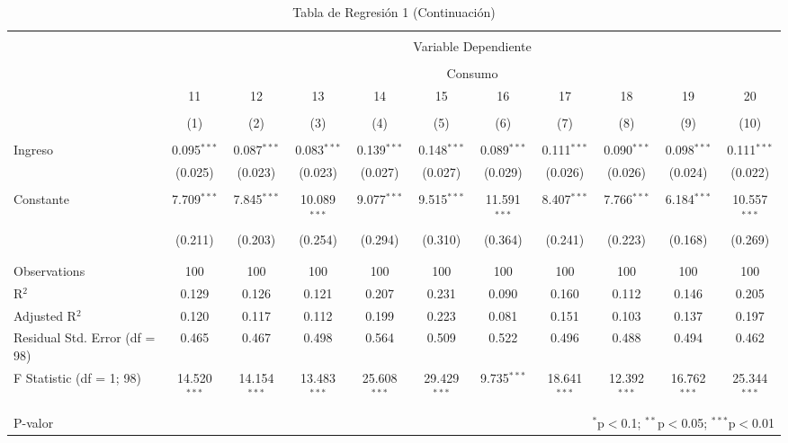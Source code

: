 \documentclass[
]{article}
\begin{document}
\begin{landscape}
\begin{table}[!htbp] \centering 
  \caption{Tabla de Regresión 1 (Continuación)} 
  \label{} 
\footnotesize 
\begin{tabular}{@{\extracolsep{5pt}}lcccccccccc} 
\\[-1.8ex]\hline 
\hline \\[-1.8ex] 
 & \multicolumn{10}{c}{Variable Dependiente} \\ 
\cline{2-11} 
\\[-1.8ex] & \multicolumn{10}{c}{Consumo} \\ 
 & 11 & 12 & 13 & 14 & 15 & 16 & 17 & 18 & 19 & 20 \\ 
\\[-1.8ex] & (1) & (2) & (3) & (4) & (5) & (6) & (7) & (8) & (9) & (10)\\ 
\hline \\[-1.8ex] 
 Ingreso & 0.095$^{***}$ & 0.087$^{***}$ & 0.083$^{***}$ & 0.139$^{***}$ & 0.148$^{***}$ & 0.089$^{***}$ & 0.111$^{***}$ & 0.090$^{***}$ & 0.098$^{***}$ & 0.111$^{***}$ \\ 
  & (0.025) & (0.023) & (0.023) & (0.027) & (0.027) & (0.029) & (0.026) & (0.026) & (0.024) & (0.022) \\ 
  & & & & & & & & & & \\ 
 Constante & 7.709$^{***}$ & 7.845$^{***}$ & 10.089$^{***}$ & 9.077$^{***}$ & 9.515$^{***}$ & 11.591$^{***}$ & 8.407$^{***}$ & 7.766$^{***}$ & 6.184$^{***}$ & 10.557$^{***}$ \\ 
  & (0.211) & (0.203) & (0.254) & (0.294) & (0.310) & (0.364) & (0.241) & (0.223) & (0.168) & (0.269) \\ 
  & & & & & & & & & & \\ 
\hline \\[-1.8ex] 
Observations & 100 & 100 & 100 & 100 & 100 & 100 & 100 & 100 & 100 & 100 \\ 
R$^{2}$ & 0.129 & 0.126 & 0.121 & 0.207 & 0.231 & 0.090 & 0.160 & 0.112 & 0.146 & 0.205 \\ 
Adjusted R$^{2}$ & 0.120 & 0.117 & 0.112 & 0.199 & 0.223 & 0.081 & 0.151 & 0.103 & 0.137 & 0.197 \\ 
Residual Std. Error (df = 98) & 0.465 & 0.467 & 0.498 & 0.564 & 0.509 & 0.522 & 0.496 & 0.488 & 0.494 & 0.462 \\ 
F Statistic (df = 1; 98) & 14.520$^{***}$ & 14.154$^{***}$ & 13.483$^{***}$ & 25.608$^{***}$ & 29.429$^{***}$ & 9.735$^{***}$ & 18.641$^{***}$ & 12.392$^{***}$ & 16.762$^{***}$ & 25.344$^{***}$ \\ 
\hline 
\hline \\[-1.8ex] 
P-valor & \multicolumn{10}{r}{$^{*}$p$<$0.1; $^{**}$p$<$0.05; $^{***}$p$<$0.01} \\ 
\end{tabular} 
\end{table} 

\end{landscape}
\end{document}
